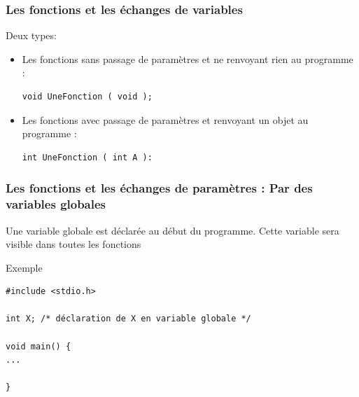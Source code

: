\documentclass{beamer}
\begin{document}
\begin{frame}[fragile]
\frametitle{Les fonctions et les échanges de variables }
Deux types:

\begin{itemize}
\item Les fonctions sans passage de paramètres et ne renvoyant rien au programme :    
		
\begin{verbatim}
void UneFonction ( void ); 
\end{verbatim}
\item Les fonctions avec passage de paramètres et renvoyant un objet au programme :
		
\begin{verbatim}
int UneFonction ( int A ): 
\end{verbatim} 

\end{itemize}


\end{frame}


\begin{frame}[fragile]
\frametitle{Les fonctions et les échanges de paramètres : Par des variables globales}

    Une variable globale est déclarée au début du programme.
    Cette variable sera visible dans toutes les fonctions

    Exemple
	
\begin{verbatim}
#include <stdio.h>

int X; /* déclaration de X en variable globale */

void main() {
...

}
\end{verbatim}

\end{frame}
\end{document}
